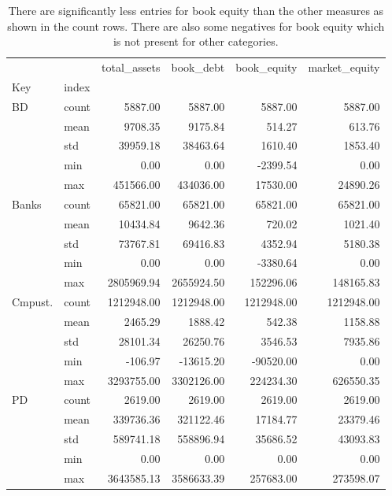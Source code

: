 \begin{table}
\caption{There are significantly less entries for book equity than the other measures as shown in the count rows. There are also some negatives for book equity which is not present for other categories. }
\label{tab:Table 2.1}
\begin{tabular}{llrrrr}
\toprule
 &  & total_assets & book_debt & book_equity & market_equity \\
Key & index &  &  &  &  \\
\midrule
{BD} & count & 5887.00 & 5887.00 & 5887.00 & 5887.00 \\
 & mean & 9708.35 & 9175.84 & 514.27 & 613.76 \\
 & std & 39959.18 & 38463.64 & 1610.40 & 1853.40 \\
 & min & 0.00 & 0.00 & -2399.54 & 0.00 \\
 & max & 451566.00 & 434036.00 & 17530.00 & 24890.26 \\
\cline{1-6}
{Banks} & count & 65821.00 & 65821.00 & 65821.00 & 65821.00 \\
 & mean & 10434.84 & 9642.36 & 720.02 & 1021.40 \\
 & std & 73767.81 & 69416.83 & 4352.94 & 5180.38 \\
 & min & 0.00 & 0.00 & -3380.64 & 0.00 \\
 & max & 2805969.94 & 2655924.50 & 152296.06 & 148165.83 \\
\cline{1-6}
{Cmpust.} & count & 1212948.00 & 1212948.00 & 1212948.00 & 1212948.00 \\
 & mean & 2465.29 & 1888.42 & 542.38 & 1158.88 \\
 & std & 28101.34 & 26250.76 & 3546.53 & 7935.86 \\
 & min & -106.97 & -13615.20 & -90520.00 & 0.00 \\
 & max & 3293755.00 & 3302126.00 & 224234.30 & 626550.35 \\
\cline{1-6}
{PD} & count & 2619.00 & 2619.00 & 2619.00 & 2619.00 \\
 & mean & 339736.36 & 321122.46 & 17184.77 & 23379.46 \\
 & std & 589741.18 & 558896.94 & 35686.52 & 43093.83 \\
 & min & 0.00 & 0.00 & 0.00 & 0.00 \\
 & max & 3643585.13 & 3586633.39 & 257683.00 & 273598.07 \\
\cline{1-6}
\bottomrule
\end{tabular}
\end{table}
